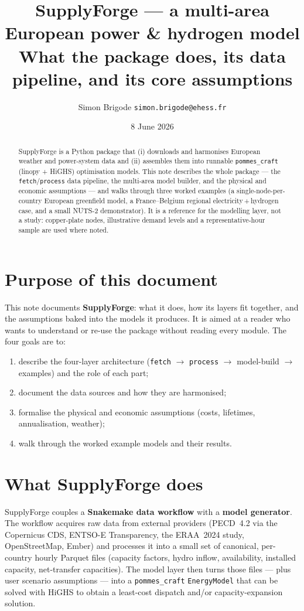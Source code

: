 \documentclass[11pt,a4paper]{article}
\title{\textbf{SupplyForge --- a multi-area European power \& hydrogen model}\\[2pt]
\large What the package does, its data pipeline, and its core assumptions}
\author{Simon Brigode \quad\textendash\quad \texttt{simon.brigode@ehess.fr}}
\date{8 June 2026}
\begin{document}
\maketitle
\thispagestyle{fancy}

\begin{abstract}
\noindent SupplyForge is a Python package that (i) downloads and harmonises European weather and
power-system data and (ii) assembles them into runnable \texttt{pommes\_craft} (linopy + HiGHS)
optimisation models. This note describes the whole package --- the \texttt{fetch}/\texttt{process}
data pipeline, the multi-area model builder, and the physical and economic assumptions --- and walks
through three worked examples (a single-node-per-country European greenfield model, a France--Belgium
regional electricity\,+\,hydrogen case, and a small NUTS-2 demonstrator). It is a reference for the
modelling layer, not a study: copper-plate nodes, illustrative demand levels and a representative-hour
sample are used where noted.
\end{abstract}

\tableofcontents
\bigskip

\section{Purpose of this document}
This note documents \textbf{SupplyForge}: what it does, how its layers fit together, and the
assumptions baked into the models it produces. It is aimed at a reader who wants to understand or
re-use the package without reading every module. The four goals are to:
\begin{enumerate}[nosep]
  \item describe the four-layer architecture (\texttt{fetch} $\to$ \texttt{process} $\to$ model-build
        $\to$ examples) and the role of each part;
  \item document the data sources and how they are harmonised;
  \item formalise the physical and economic assumptions (costs, lifetimes, annualisation, weather);
  \item walk through the worked example models and their results.
\end{enumerate}

\section{What SupplyForge does}
SupplyForge couples a \textbf{Snakemake data workflow} with a \textbf{model generator}. The workflow
acquires raw data from external providers (PECD~4.2 via the Copernicus CDS, ENTSO-E Transparency, the
ERAA~2024 study, OpenStreetMap, Ember) and processes it into a small set of canonical, per-country
hourly Parquet files (capacity factors, hydro inflow, availability, installed capacity, net-transfer
capacities). The model layer then turns those files --- plus user scenario assumptions --- into a
\texttt{pommes\_craft} \texttt{EnergyModel} that can be solved with HiGHS to obtain a least-cost
dispatch and/or capacity-expansion solution.
\end{document}

